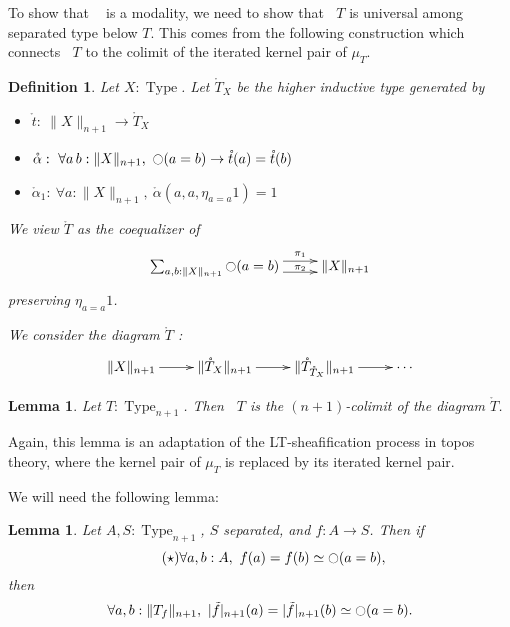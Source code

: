 \documentclass[preprint,9pt,numbers]{sigplanconf}
\makeatletter
\newtheorem{defi}[thm]{Definition}
\newtheorem{lem}[thm]{Lemma}
\def\dar[#1]#2{\ar@<-#2>[#1]\ar@<#2>[#1]} %
\DeclareMathOperator{\Type}{Type}
\newcommand{\modal}{\ensuremath{\ocircle}}
\newcommand \separated {\mathop{\square_{n+1}} }
\newenvironment{mymath}[1][-0em]{%
  \newcommand\mymathaux{\vspace{#1}}%
  \vspace{#1}%
  \begin{equation*}%
  }{ %
    \mymathaux%
  \end{equation*}}
\makeatother
\begin{document}
To show that $\separated$ is a modality, we need to show that $\separated T$
is universal among separated type below $T$. This comes from the
following construction which connects $\separated T$ to the colimit of
the iterated kernel pair of $\mu_T$.

\begin{defi}
  Let $X:\Type$. Let $\mathring T_X$ be the higher inductive type
  generated by
  \begin{itemize}
  \item $\mathring t:~\|X\|_{n+1} \to \mathring T_X$
  \item $\mathring \alpha:~\forall a\, b:\|X\|_{n+1},~\modal (a=b) \to
    \mathring t(a) = \mathring t(b)$
  \item $\mathring \alpha_1:~\forall a:\|X\|_{n+1},~
    \mathring \alpha(a , a, \eta_{a=a} 1) = 1$
  \end{itemize}

  We view $\mathring T$ as the coequalizer of
  \begin{mymath}\xymatrix{\sum_{a,b:\|X\|_{n+1}} \modal (a=b) \dar[r]{4pt}^-{\pi_1}_-{\pi_2}
  & \|X\|_{n+1}}\end{mymath}%
  preserving $\eta_{a=a} 1$.

  We consider the diagram $\mathring T$ :
  \begin{mymath}\xymatrix{\|X\|_{n+1} \ar[r] & \|\mathring T_{X}\|_{n+1} \ar[r] & \|\mathring
  T_{\mathring T_X} \|_{n+1} \ar[r] & \cdots} \end{mymath}%
\end{defi}



\begin{lem}\label{lem:sepiscolim}
  Let $T:\Type_{n+1}$. Then $\separated T$ is the $(n+1)$-colimit of the
  diagram $\mathring T$.
\end{lem}

Again, this lemma is an adaptation of the LT-sheafification process in
topos theory, where the kernel pair of $\mu_T$
is replaced by its iterated kernel pair.

We will need the following lemma:

\begin{lem}
  Let $A,S:\Type_{n+1}$, $S$ separated, and $f:A \to S$. Then if 
  \begin{equation}
    \label{eq:Omono}\tag{$\star$}
    \forall a,b:A,~f (a) = f (b) \simeq \modal (a=b),
  \end{equation}
  then
  \begin{mymath}\forall a,b:\|T_f\|_{n+1},~|\tilde f|_{n+1} (a) = |\tilde f|_{n+1} (b) \simeq \modal (a=b).\end{mymath}%
\end{lem}
\end{document}
